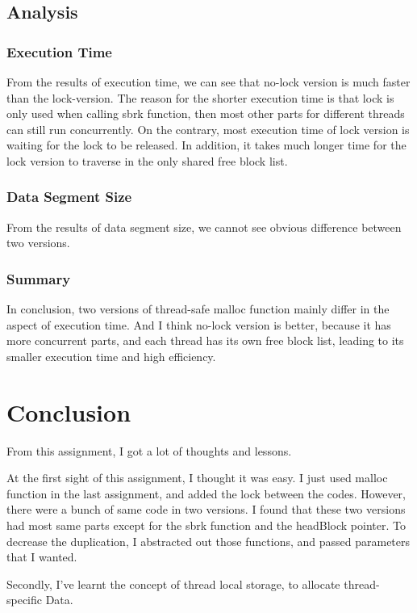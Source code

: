 \documentclass[a4paper,10pt]{article}
\begin{document}
    \subsection{Analysis}
    \subsubsection{Execution Time}
    \par From the results of execution time, we can see that no-lock version is much faster
    than the lock-version. The reason for the shorter execution time is that lock is only used
    when calling sbrk function, then most other parts for different threads can still run 
    concurrently. On the contrary, most execution time of lock version is waiting for the lock
    to be released. In addition, it takes much longer time for the lock version to traverse in 
    the only shared free block list.
    
    \subsubsection{Data Segment Size}
    \par From the results of data segment size, we cannot see obvious difference between two
    versions. 
    
    \subsubsection{Summary}
    \par In conclusion, two versions of thread-safe malloc function mainly differ in the
    aspect of execution time. And I think no-lock version is better, because it has more
    concurrent parts, and each thread has its own free block list, leading to its smaller
    execution time and high efficiency.
    
    \section{Conclusion}
    \par From this assignment, I got a lot of thoughts and lessons.
    \par At the first sight of this assignment, I thought it was easy. I just used malloc
    function in the last assignment, and added the lock between the codes. 
    However, there were a bunch of same code in two versions. 
    I found that these two versions had most same parts except for the sbrk function and 
    the headBlock pointer. To decrease the duplication, I abstracted out those functions, 
    and passed parameters that I wanted.
    \par Secondly, I've learnt the concept of thread local storage, to allocate thread-specific 
    Data.
    
\end{document}
